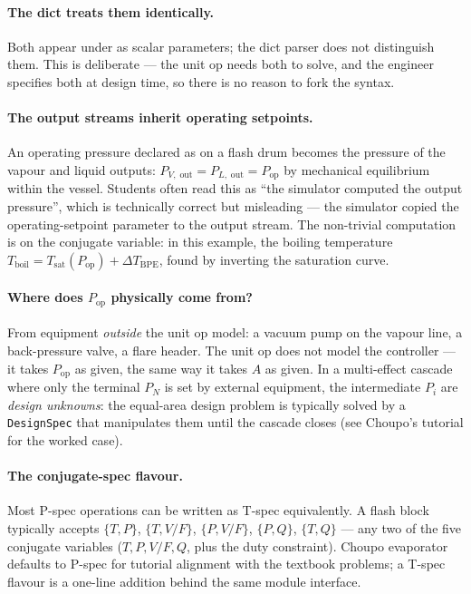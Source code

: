 \documentclass[11pt,a4paper]{article}
\begin{document}
\paragraph{The dict treats them identically.}  Both appear under
 as scalar parameters; the dict
parser does not distinguish them.  This is deliberate --- the
unit op needs both to solve, and the engineer specifies both at
design time, so there is no reason to fork the syntax.

\paragraph{The output streams inherit operating setpoints.}  An
operating pressure declared as 
on a flash drum becomes the pressure of the vapour and liquid
outputs:  $P_{\!V\!,\;\text{out}} = P_{\!L\!,\;\text{out}} =
P_{\!\text{op}}$ by mechanical equilibrium within the vessel.
Students often read this as ``the simulator computed the output
pressure'', which is technically correct but misleading --- the
simulator copied the operating-setpoint parameter to the output
stream.  The non-trivial computation is on the conjugate
variable: in this example, the boiling temperature
$T_{\!\text{boil}} = T_{\!\text{sat}}(P_{\!\text{op}}) + \Delta
T_{\!\text{BPE}}$, found by inverting the saturation curve.

\paragraph{Where does $P_{\!\text{op}}$ physically come from?}
From equipment \emph{outside} the unit op model: a vacuum pump
on the vapour line, a back-pressure valve, a flare header.  The
unit op does not model the controller --- it takes
$P_{\!\text{op}}$ as given, the same way it takes $A$ as given.
In a multi-effect cascade where only the terminal $P_N$ is set
by external equipment, the intermediate $P_i$ are
\emph{design unknowns}:  the equal-area design problem is
typically solved by a \texttt{DesignSpec} that manipulates them
until the cascade closes (see Choupo's
 tutorial for the worked case).

\paragraph{The conjugate-spec flavour.}  Most P-spec operations
can be written as T-spec equivalently.  A flash
block typically accepts $\{T,P\}$, $\{T,V/F\}$, $\{P,V/F\}$, $\{P,Q\}$,
$\{T,Q\}$ --- any two of the five conjugate variables ($T,P,V/F,
Q$, plus the duty constraint).  Choupo evaporator
defaults to P-spec for tutorial alignment with the textbook
problems; a T-spec flavour is a one-line addition behind the
same module interface.
\end{document}
